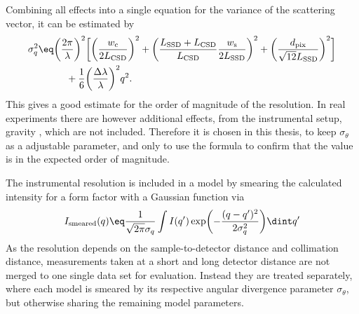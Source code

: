 \documentclass[\main/dresen_thesis.tex]{subfiles}
\begin{document}
    Combining all effects into a single equation for the variance of the scattering vector, it can be estimated by
    \begin{align}
      \begin{split}\label{eq:methods:sans:instrumentalResolution}
        \sigma_q^2
        &\eq
          \biggl( \frac{2\pi}{\lambda} \biggr)^2 \biggl[ \biggl( \frac{w_\mathrm{c}}{2 L_\mathrm{CSD}} \biggr)^2 +
          \biggl( \frac{L_\mathrm{SSD} + L_\mathrm{CSD}}{L_\mathrm{CSD}} \frac{w_\mathrm{s}}{2 L_\mathrm{SSD}} \biggr)^2 +
          \biggl( \frac{d_\mathrm{pix}}{\sqrt{12} L_\mathrm{SSD}} \biggr)^2 \biggr] \\
        &\hspace{1cm}+ \frac{1}{6} \biggl( \frac{\Delta \lambda}{\lambda} \biggr)^2 q^2 .
      \end{split}
    \end{align}
    This gives a good estimate for the order of magnitude of the resolution.
    In real experiments there are however additional effects, from the instrumental setup, gravity \etc, which are not included.
    Therefore it is chosen in this thesis, to keep $\sigma_\theta$ as a adjustable parameter, and only to use the formula to confirm that the value is in the expected order of magnitude.

    The instrumental resolution is included in a model by smearing the calculated intensity for a form factor with a Gaussian function via
    \begin{align}
      I_\mathrm{smeared} (q) \eq \frac{1}{\sqrt{2 \pi}\sigma_q}  \int I(q^\prime) \exp\biggl(-\frac{(q - q^\prime)^2}{2 \sigma_q^2}\biggr)\dint q^\prime
    \end{align}
    As the resolution depends on the sample-to-detector distance and collimation distance, measurements taken at a short and long detector distance are not merged to one single data set for evaluation.
    Instead they are treated separately, where each model is smeared by its respective angular divergence parameter $\sigma_\theta$, but otherwise sharing the remaining model parameters.
\end{document}
